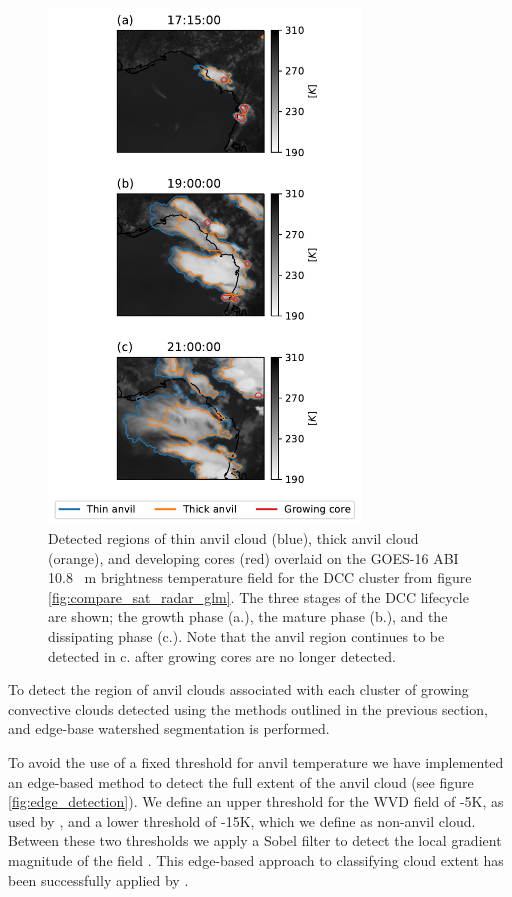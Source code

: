 \documentclass[amt, manuscript]{copernicus}
\begin{document}
\begin{figure}[t]
    \includegraphics[width=8.3cm]{figure08.pdf}
    \caption{Detected regions of thin anvil cloud (blue), thick anvil cloud (orange), and developing cores (red) overlaid on the GOES-16 ABI 10.8 \unit{\mu m} brightness temperature field for the DCC cluster from figure \ref{fig:compare_sat_radar_glm}. The three stages of the DCC lifecycle are shown; the growth phase (a.), the mature phase (b.), and the dissipating phase (c.). Note that the anvil region continues to be detected in c. after growing cores are no longer detected.}
    \label{fig:detected_anvils}
\end{figure}

To detect the region of anvil clouds associated with each cluster of growing convective clouds detected using the methods outlined in the previous section, and edge-base watershed segmentation is performed.

To avoid the use of a fixed threshold for anvil temperature we have implemented an edge-based method to detect the full extent of the anvil cloud (see figure \ref{fig:edge_detection}).
We define an upper threshold for the WVD field of -5\unit{K}, as used by \citet{muller_role_2018}, and a lower threshold of -15\unit{K}, which we define as non-anvil cloud.
Between these two thresholds we apply a Sobel filter to detect the local gradient magnitude of the field \citep{sobel_isotropic_2014}.
This edge-based approach to classifying cloud extent has been successfully applied by \citet{dim_alternative_2013}.
\end{document}

